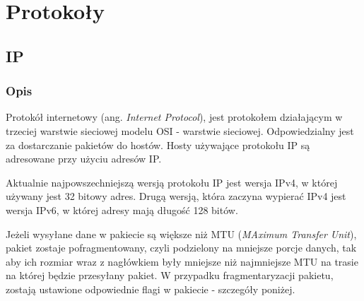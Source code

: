 \chapter{Protokoły}
	\section{IP}
		\subsection{Opis}
			Protokół internetowy (ang. \textit{Internet Protocol}), jest protokołem działającym w trzeciej warstwie sieciowej modelu OSI - warstwie sieciowej.
			Odpowiedzialny jest za dostarczanie pakietów do hostów.
			Hosty używające protokołu IP są adresowane przy użyciu adresów IP.

			Aktualnie najpowszechniejszą wersją protokołu IP jest wersja IPv4, w której używany jest 32 bitowy adres.
			Drugą wersją, która zaczyna wypierać IPv4 jest wersja IPv6, w której adresy mają długość 128 bitów.

			Jeżeli wysyłane dane w pakiecie są większe niż MTU (\textit{MAximum Transfer Unit}), pakiet zostaje pofragmentowany, czyli podzielony na mniejsze porcje danych, tak aby ich rozmiar wraz z nagłówkiem były mniejsze niż najmniejsze MTU na trasie na której będzie przesyłany pakiet.
			W przypadku fragmentaryzacji pakietu, zostają ustawione odpowiednie flagi w pakiecie - szczegóły poniżej.
